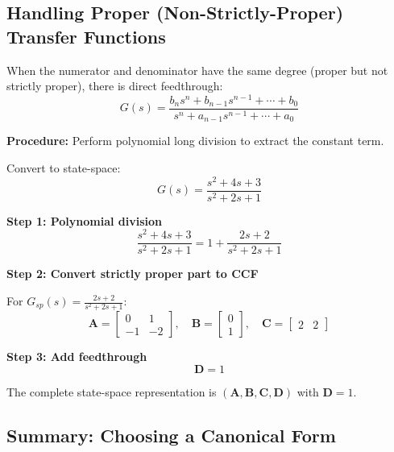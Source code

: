 \subsection{Handling Proper (Non-Strictly-Proper) Transfer Functions}

When the numerator and denominator have the same degree (proper but not strictly proper), there is direct feedthrough:
\begin{equation}
G(s) = \frac{b_n s^n + b_{n-1}s^{n-1} + \cdots + b_0}{s^n + a_{n-1}s^{n-1} + \cdots + a_0}
\end{equation}

\textbf{Procedure:} Perform polynomial long division to extract the constant term.

\begin{example}
Convert to state-space:
\begin{equation}
G(s) = \frac{s^2 + 4s + 3}{s^2 + 2s + 1}
\end{equation}

\textbf{Step 1: Polynomial division}
\begin{equation}
\frac{s^2 + 4s + 3}{s^2 + 2s + 1} = 1 + \frac{2s + 2}{s^2 + 2s + 1}
\end{equation}

\textbf{Step 2: Convert strictly proper part to CCF}

For $G_{sp}(s) = \frac{2s + 2}{s^2 + 2s + 1}$:
\begin{equation}
\mathbf{A} = \begin{bmatrix} 0 & 1 \\ -1 & -2 \end{bmatrix}, \quad
\mathbf{B} = \begin{bmatrix} 0 \\ 1 \end{bmatrix}, \quad
\mathbf{C} = \begin{bmatrix} 2 & 2 \end{bmatrix}
\end{equation}

\textbf{Step 3: Add feedthrough}
\begin{equation}
\mathbf{D} = 1
\end{equation}

The complete state-space representation is $(\mathbf{A}, \mathbf{B}, \mathbf{C}, \mathbf{D})$ with $\mathbf{D} = 1$.
\end{example}

\subsection{Summary: Choosing a Canonical Form}

